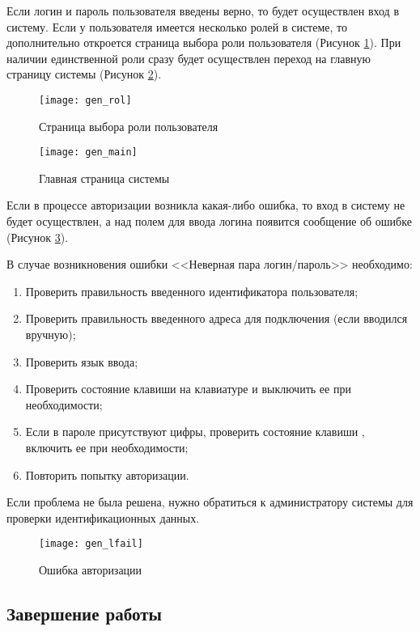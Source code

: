 Если логин и пароль пользователя введены верно, то будет осуществлен вход в систему. Если у пользователя имеется несколько ролей в системе, то дополнительно откроется страница выбора роли пользователя (Рисунок \ref{img_gen_rol}). При наличии единственной роли сразу будет осуществлен переход на главную страницу системы (Рисунок \ref{img_gen_main}).

\begin{figure}[!ht]\centering
 \texttt{[image: gen\_rol]}
 \caption{Страница выбора роли пользователя}
 \label{img_gen_rol}
\end{figure} 

\begin{figure}[!ht]\centering
 \texttt{[image: gen\_main]}
 \caption{Главная страница системы}
 \label{img_gen_main}
\end{figure} 

Если в процессе авторизации возникла какая-либо ошибка, то вход в систему не будет осуществлен, а над полем для ввода логина появится сообщение об ошибке (Рисунок \ref{img_gen_lfail}).

В случае возникновения ошибки <<Неверная пара логин/пароль>> необходимо:
\begin{enumerate}
 \item Проверить правильность введенного идентификатора пользователя;
 \item Проверить правильность введенного адреса для подключения (если вводился вручную);
 \item Проверить язык ввода;
 \item Проверить состояние клавиши  на клавиатуре и выключить ее при необходимости;
 \item Если в пароле присутствуют цифры, проверить состояние клавиши , включить ее при необходимости;
 \item Повторить попытку авторизации.
\end{enumerate}
 
Если проблема не была решена, нужно обратиться к администратору системы для проверки идентификационных данных.

\begin{figure}[!ht]\centering
 \texttt{[image: gen\_lfail]}
 \caption{Ошибка авторизации}
 \label{img_gen_lfail}
\end{figure} 

\subsection{Завершение работы}

